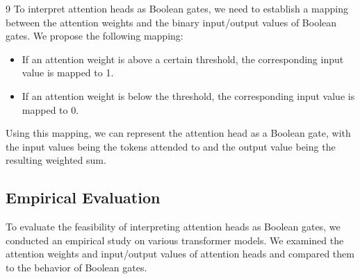 \documentclass[11pt]{article}
\theoremstyle{definition}
\begin{document}
\begin{thebibliography}{9}
To interpret attention heads as Boolean gates, we need to establish a mapping between the attention weights and the binary input/output values of Boolean gates. We propose the following mapping:













\begin{itemize}






\item If an attention weight is above a certain threshold, the corresponding input value is mapped to 1.






\item If an attention weight is below the threshold, the corresponding input value is mapped to 0.






\end{itemize}













Using this mapping, we can represent the attention head as a Boolean gate, with the input values being the tokens attended to and the output value being the resulting weighted sum.













\subsection{Empirical Evaluation}













To evaluate the feasibility of interpreting attention heads as Boolean gates, we conducted an empirical study on various transformer models. We examined the attention weights and input/output values of attention heads and compared them to the behavior of Boolean gates.














\end{thebibliography}
\end{document}
